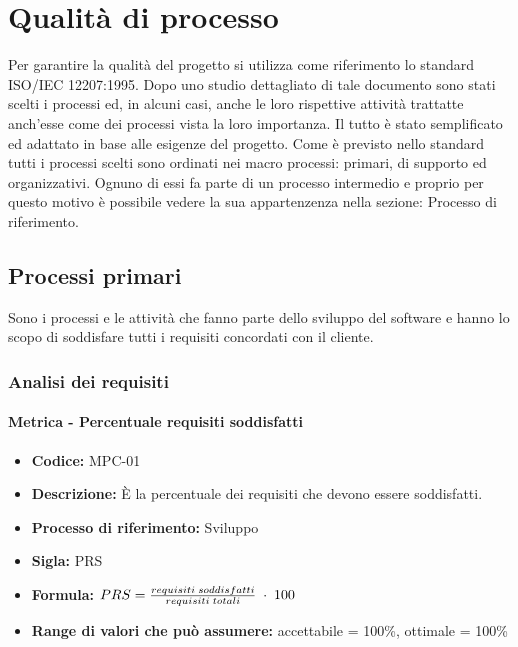 \section{Qualità di processo}
Per garantire la qualità del progetto si utilizza come riferimento lo standard ISO/IEC 12207:1995. Dopo uno studio dettagliato di tale documento sono stati scelti i processi
ed, in alcuni casi, anche le loro rispettive attività trattatte anch'esse come dei processi vista la loro importanza. Il tutto è stato semplificato ed adattato in base alle 
esigenze del progetto. Come è previsto nello standard tutti i processi scelti sono ordinati nei macro processi: primari, di supporto ed organizzativi. Ognuno di essi fa parte 
di un processo intermedio e proprio per questo motivo è possibile vedere la sua appartenzenza nella sezione: Processo di riferimento.

\subsection{Processi primari}
Sono i processi e le attività che fanno parte dello sviluppo del software e hanno lo scopo di soddisfare tutti i requisiti concordati con il cliente.

\subsubsection{Analisi dei requisiti}
    \paragraph{Metrica - Percentuale requisiti soddisfatti}
    \begin{itemize}
        \item \textbf{Codice:} MPC-01
        \item \textbf{Descrizione:} È la percentuale dei requisiti che devono essere soddisfatti.
        \item \textbf{Processo di riferimento:} Sviluppo
        \item \textbf{Sigla:} PRS
        \item \textbf{Formula:} \begin{math}{PRS = {requisiti \; soddisfatti \over requisiti \; totali}\; \cdot \; 100}\end{math}
        \item \textbf{Range di valori che può assumere:} accettabile = 100\%, ottimale = 100\% 
    \end{itemize}

